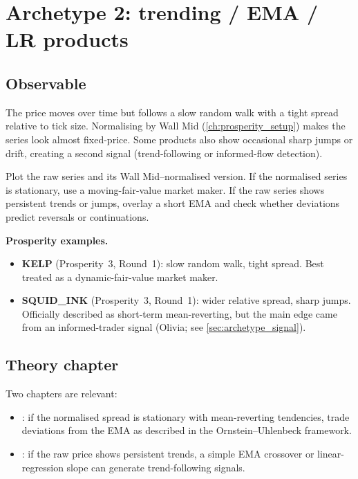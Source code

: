 \section{Archetype 2: trending / EMA / LR products}
\label{sec:archetype_trend}

\subsection{Observable}

The price moves over time but follows a slow random walk with a
tight spread relative to tick size.  Normalising by Wall Mid
(\cref{ch:prosperity_setup}) makes the series look almost fixed-price.
Some products also show occasional sharp jumps or drift, creating a
second signal (trend-following or informed-flow detection).

\begin{keyfactbox}[Diagnostic]
Plot the raw series and its Wall Mid--normalised version.  If the
normalised series is stationary, use a moving-fair-value market
maker.  If the raw series shows persistent trends or jumps, overlay a
short EMA and check whether deviations predict reversals or
continuations.
\end{keyfactbox}

\noindent
\textbf{Prosperity examples.}
\begin{itemize}
  \item \textbf{KELP} (Prosperity~3, Round~1): slow random walk,
  tight spread.  Best treated as a dynamic-fair-value market maker.
  \item \textbf{SQUID\_INK} (Prosperity~3, Round~1): wider relative
  spread, sharp jumps.  Officially described as short-term
  mean-reverting, but the main edge came from an informed-trader signal
  (Olivia; see \cref{sec:archetype_signal}).
\end{itemize}

\subsection{Theory chapter}

Two chapters are relevant:
\begin{itemize}
  \item {}: if the normalised spread is
  stationary with mean-reverting tendencies, trade deviations from the
  EMA as described in the Ornstein--Uhlenbeck framework.
  \item {}: if the raw price shows persistent trends,
  a simple EMA crossover or linear-regression slope can generate
  trend-following signals.
\end{itemize}

